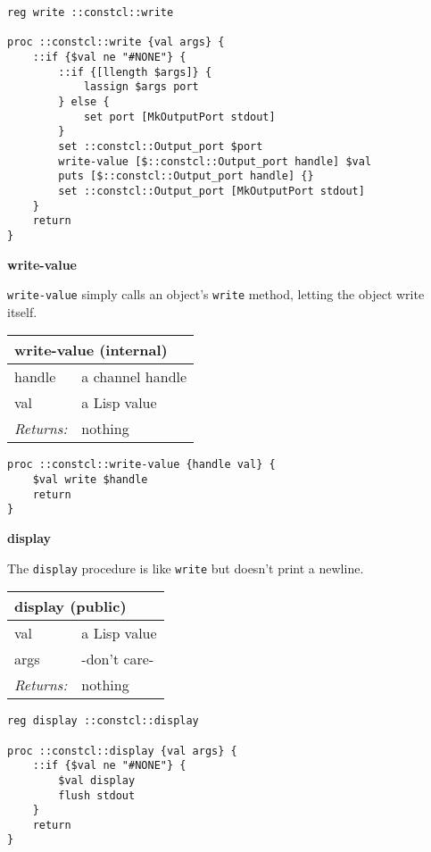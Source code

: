 \documentclass{report}
\begin{document}
\noindent\makebox[\linewidth]{\rule{\linewidth}{0.4pt}}
\begin{lstlisting}
reg write ::constcl::write
 
proc ::constcl::write {val args} {
    ::if {$val ne "#NONE"} {
        ::if {[llength $args]} {
            lassign $args port
        } else {
            set port [MkOutputPort stdout]
        }
        set ::constcl::Output_port $port
        write-value [$::constcl::Output_port handle] $val
        puts [$::constcl::Output_port handle] {}
        set ::constcl::Output_port [MkOutputPort stdout]
    }
    return
}
\end{lstlisting}
\noindent\makebox[\linewidth]{\rule{\linewidth}{0.4pt}}

\textbf{write-value}


\texttt{write-value} simply calls an object's \texttt{write} method, letting the object write itself.

\begin{tabular}{ |l l| }
\hline
\multicolumn{2}{|l|}{write-value (internal)} \\
\hline
handle & a channel handle \\
val & a Lisp value \\
\textit{Returns:} & nothing \\
\hline
\end{tabular}

\noindent\makebox[\linewidth]{\rule{\linewidth}{0.4pt}}
\begin{lstlisting}
proc ::constcl::write-value {handle val} {
    $val write $handle
    return
}
\end{lstlisting}
\noindent\makebox[\linewidth]{\rule{\linewidth}{0.4pt}}

\textbf{display}


The \texttt{display} procedure is like \texttt{write} but doesn't print a newline.

\begin{tabular}{ |l l| }
\hline
\multicolumn{2}{|l|}{display (public)} \\
\hline
val & a Lisp value \\
args & -don't care- \\
\textit{Returns:} & nothing \\
\hline
\end{tabular}

\noindent\makebox[\linewidth]{\rule{\linewidth}{0.4pt}}
\begin{lstlisting}
reg display ::constcl::display
 
proc ::constcl::display {val args} {
    ::if {$val ne "#NONE"} {
        $val display
        flush stdout
    }
    return
}
\end{lstlisting}
\noindent\makebox[\linewidth]{\rule{\linewidth}{0.4pt}}
\end{document}
